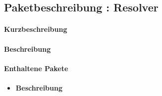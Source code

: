 \subsection{Paketbeschreibung : Resolver}%
\paragraph*{Kurzbeschreibung}
\paragraph*{Beschreibung}
\paragraph*{Enthaltene Pakete}
\begin{itemize}
    \item 
    		\paragraph*{Beschreibung}
          
\end{itemize}
